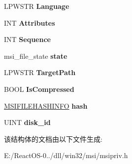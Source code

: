 \begin{DoxyCompactItemize}
L\+P\+W\+S\+TR {\bfseries Language}
\item 
\mbox{\label{structtag_m_s_i_f_i_l_e_aeef40e39a2aeacca5209bf56fac574a1}} 
I\+NT {\bfseries Attributes}
\item 
\mbox{\label{structtag_m_s_i_f_i_l_e_a850346af70ac1b32cfd07d149d2ddc39}} 
I\+NT {\bfseries Sequence}
\item 
\mbox{\label{structtag_m_s_i_f_i_l_e_a732cbde265bd065f5594a7b281635687}} 
msi\+\_\+file\+\_\+state {\bfseries state}
\item 
\mbox{\label{structtag_m_s_i_f_i_l_e_ab4713f5237c37eac0f65de16e2f1f838}} 
L\+P\+W\+S\+TR {\bfseries Target\+Path}
\item 
\mbox{\label{structtag_m_s_i_f_i_l_e_a5fb05a8e8f6fe252fd62d8b12b382cdc}} 
B\+O\+OL {\bfseries Is\+Compressed}
\item 
\mbox{\label{structtag_m_s_i_f_i_l_e_a6b19e55f973f5feb69ebd3b1ae91642b}} 
\hyperlink{struct___m_s_i_f_i_l_e_h_a_s_h_i_n_f_o}{M\+S\+I\+F\+I\+L\+E\+H\+A\+S\+H\+I\+N\+FO} {\bfseries hash}
\item 
\mbox{\label{structtag_m_s_i_f_i_l_e_af3d62a287e3c1a1a4bf0e998815803c6}} 
U\+I\+NT {\bfseries disk\+\_\+id}
\end{DoxyCompactItemize}


该结构体的文档由以下文件生成\+:\begin{DoxyCompactItemize}
\item 
E\+:/\+React\+O\+S-\/0../dll/win32/msi/msipriv.\+h\end{DoxyCompactItemize}
